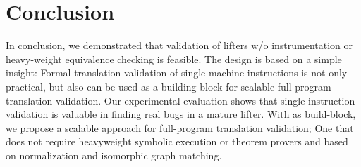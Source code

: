 \section{Conclusion}\label{sec:conc}

In conclusion, we demonstrated that validation of lifters w/o instrumentation 
or heavy-weight equivalence checking is feasible.  The design is based  on a 
simple insight: Formal translation validation of 
single machine 
instructions is not only practical, but also can be used as a building 
block for scalable full-program translation validation. Our experimental 
evaluation shows that single instruction validation
is valuable in finding real bugs in a mature lifter. With \siv as build-block, 
we propose a scalable 
approach for full-program translation validation; One that does not require 
heavyweight symbolic execution or theorem 
provers and  based on normalization 
and isomorphic graph matching.  